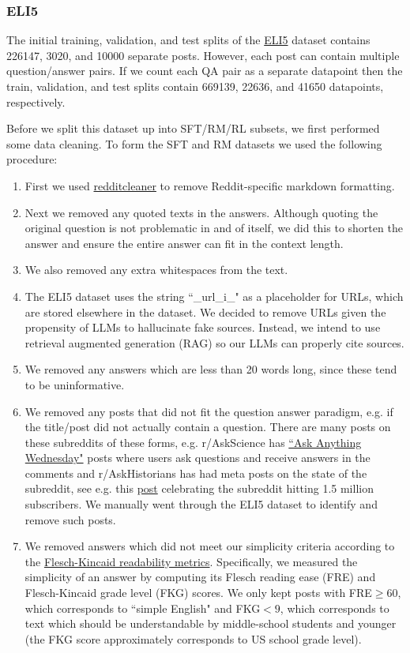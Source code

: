 \documentclass[11pt, oneside]{article}   	%
\begin{document}
\subsubsection{ELI5}
The initial training, validation, and test splits of the \href{https://huggingface.co/datasets/vblagoje/lfqa}{ELI5} dataset contains 226147, 3020, and 10000 separate posts. 
However, each post can contain multiple question/answer pairs.
If we count each QA pair as a separate datapoint then the train, validation, and test splits contain 669139, 22636, and 41650 datapoints, respectively.

Before we split this dataset up into SFT/RM/RL subsets, we first performed some data cleaning.
To form the SFT and RM datasets we used the following procedure:
\begin{enumerate}
\item First we used \href{https://pypi.org/project/redditcleaner/}{redditcleaner} to remove Reddit-specific markdown formatting.
\item Next we removed any quoted texts in the answers. Although quoting the original question is not problematic in and of itself, we did this to shorten the answer and ensure the entire answer can fit in the context length.
\item We also removed any extra whitespaces from the text.
\item The ELI5 dataset uses the string ``\_url\_i\_" as a placeholder for URLs, which are stored elsewhere in the dataset. 
We decided to remove URLs given the propensity of LLMs to hallucinate fake sources.
Instead, we intend to use retrieval augmented generation (RAG) so our LLMs can properly cite sources.
\item We removed any answers which are less than 20 words long, since these tend to be uninformative. 
\item We removed any posts that did not fit the question answer paradigm, e.g. if the title/post did not actually contain a question.
There are many posts on these subreddits of these forms, e.g. r/AskScience has \href{https://www.reddit.com/r/askscience/comments/10wyuf9/ask_anything_wednesday_engineering_mathematics/}{``Ask Anything Wednesday"} posts where users ask questions and receive answers in the comments and r/AskHistorians has had meta posts on the state of the subreddit, see e.g. this \href{https://www.reddit.com/r/AskHistorians/comments/yfs7uh/askhistorians_has_hit_15_million_subscribers_to/}{post} celebrating the subreddit hitting 1.5 million subscribers. We manually went through the ELI5 dataset to identify and remove such posts.
\item We removed answers which did not meet our simplicity criteria according to the \href{https://en.Wikipedia.org/Wiki/Flesch\%E2\%80\%93Kincaid_readability_tests}{Flesch-Kincaid readability metrics}. Specifically, we measured the simplicity of an answer by computing its Flesch reading ease (FRE) and Flesch-Kincaid grade level (FKG) scores. We only kept posts with FRE$\geq 60$, which corresponds to ``simple English" and FKG$< 9$, which corresponds to text which should be understandable by middle-school students and younger (the FKG score approximately corresponds to US school grade level). 
\end{enumerate}
\end{document}
